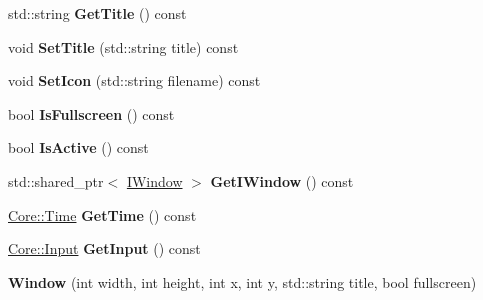 \begin{DoxyCompactItemize}
\item 
\hypertarget{class_jade_1_1_system_1_1_window_a61e1612462c18be13dc3b2e1a01dfce5}{}std\+::string {\bfseries Get\+Title} () const \label{class_jade_1_1_system_1_1_window_a61e1612462c18be13dc3b2e1a01dfce5}

\item 
\hypertarget{class_jade_1_1_system_1_1_window_a275f84ab49b78f1ba46612447f5683e1}{}void {\bfseries Set\+Title} (std\+::string title) const \label{class_jade_1_1_system_1_1_window_a275f84ab49b78f1ba46612447f5683e1}

\item 
\hypertarget{class_jade_1_1_system_1_1_window_a0d6abe35b92fd2d2598919062b0e6b0c}{}void {\bfseries Set\+Icon} (std\+::string filename) const \label{class_jade_1_1_system_1_1_window_a0d6abe35b92fd2d2598919062b0e6b0c}

\item 
\hypertarget{class_jade_1_1_system_1_1_window_ae36b19e7f8e05bb0e1af58063e1f3f7b}{}bool {\bfseries Is\+Fullscreen} () const \label{class_jade_1_1_system_1_1_window_ae36b19e7f8e05bb0e1af58063e1f3f7b}

\item 
\hypertarget{class_jade_1_1_system_1_1_window_a1b05887e9ddd213ba43a16a4caf5d85f}{}bool {\bfseries Is\+Active} () const \label{class_jade_1_1_system_1_1_window_a1b05887e9ddd213ba43a16a4caf5d85f}

\item 
\hypertarget{class_jade_1_1_system_1_1_window_a092090dd6658c8edca8c9030d0c00490}{}std\+::shared\+\_\+ptr$<$ \hyperlink{struct_jade_1_1_system_1_1_i_window}{I\+Window} $>$ {\bfseries Get\+I\+Window} () const \label{class_jade_1_1_system_1_1_window_a092090dd6658c8edca8c9030d0c00490}

\item 
\hypertarget{class_jade_1_1_system_1_1_window_a24602ca7f09a199f304b2418371816f1}{}\hyperlink{class_jade_1_1_core_1_1_time}{Core\+::\+Time} {\bfseries Get\+Time} () const \label{class_jade_1_1_system_1_1_window_a24602ca7f09a199f304b2418371816f1}

\item 
\hypertarget{class_jade_1_1_system_1_1_window_a740d374f06c2ed8dc5583d2f940df971}{}\hyperlink{struct_jade_1_1_core_1_1_input}{Core\+::\+Input} {\bfseries Get\+Input} () const \label{class_jade_1_1_system_1_1_window_a740d374f06c2ed8dc5583d2f940df971}

\item 
\hypertarget{class_jade_1_1_system_1_1_window_a7c43d89407ac25953bc0f73d34fffe33}{}{\bfseries Window} (int width, int height, int x, int y, std\+::string title, bool fullscreen)\label{class_jade_1_1_system_1_1_window_a7c43d89407ac25953bc0f73d34fffe33}


\end{DoxyCompactItemize}
